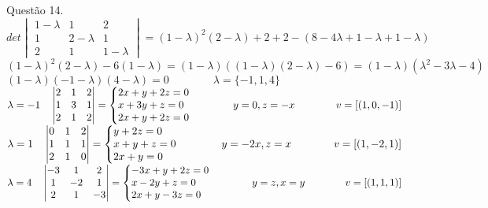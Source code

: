 \documentclass[12pt]{article}
\begin{document}
\noindent Questão 14.\\

$det\begin{vmatrix}1-\lambda&1&2\\1&2-\lambda&1\\2&1&1-\lambda\end{vmatrix}=(1-\lambda)^{2}(2-\lambda)+2+2-(8-4\lambda+1-\lambda+1-\lambda)$\\

$(1-\lambda)^{2}(2-\lambda)-6(1-\lambda)=(1-\lambda)((1-\lambda)(2-\lambda)-6)=(1-\lambda)(\lambda^{2}-3\lambda-4)$\\

$(1-\lambda)(-1-\lambda)(4-\lambda)=0\qquad\qquad\lambda=\lbrace-1,1,4\rbrace$\\

$\lambda=-1\quad\begin{vmatrix}2&1&2\\1&3&1\\2&1&2\end{vmatrix}=\left\{\begin{array}{@{}l@{}}2x+y+2z=0\\x+3y+z=0\\2x+y+2z=0\end{array}\right.\qquad\qquad y=0,z=-x\qquad\qquad v=[(1,0,-1)]$\\

$\lambda=1\quad\begin{vmatrix}0&1&2\\1&1&1\\2&1&0\end{vmatrix}=\left\{\begin{array}{@{}l@{}}y+2z=0\\x+y+z=0\\2x+y=0\end{array}\right.\qquad\qquad y=-2x,z=x \qquad\qquad v=[(1,-2,1)]$\\

$\lambda=4\quad\begin{vmatrix}-3&1&2\\1&-2&1\\2&1&-3\end{vmatrix}=\left\{\begin{array}{@{}l@{}}-3x+y+2z=0\\x-2y+z=0\\2x+y-3z=0\end{array}\right.\qquad\qquad y=z,x=y \qquad\qquad v=[(1,1,1)]$\\
\end{document}
